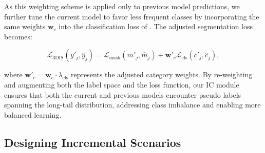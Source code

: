 As this weighting scheme is applied only to previous model predictions, we further tune the current model to favor less frequent classes by incorporating the same weights $\mathbf{w}_c$ into the classification loss of . The adjusted segmentation loss becomes:

\begin{equation}
\label{eq:climb_loss}
\mathcal{L}_\mathrm{3DIS}(y'_j, \hat{y}_j) = \mathcal{L}_\mathrm{mask}(m'_j, \hat{m}_j) + \mathbf{w}'_c\mathcal{L}_\mathrm{cls}(c'_j, \hat{c}_j),
\end{equation}

\noindent where $\mathbf{w}'_c = \mathbf{w}_c \cdot \lambda_\mathrm{cls}$ represents the adjusted category weights. By re-weighting and augmenting both the label space and the loss function, our IC module ensures that both the current and previous models encounter pseudo labels spanning the long-tail distribution, addressing class imbalance and enabling more balanced learning.

\subsection{Designing Incremental Scenarios}
\label{sec:scenarios}


